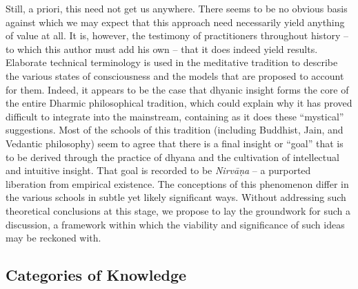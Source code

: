 \documentclass[pra,twocolumn,groupedaddress,10pt]{revtex4}
\theoremstyle{definition}
\begin{document}
Still, a priori, this need not get us anywhere. There seems to be no obvious basis against which we may expect that this approach need necessarily yield anything of value at all. It is, however, the testimony of practitioners throughout history -- to which this author must add his own -- that it does indeed yield results. Elaborate technical terminology is used in the meditative tradition to describe the various states of consciousness and the models that are proposed to account for them. Indeed, it appears to be the case that dhyanic insight forms the core of the entire Dharmic philosophical tradition, which could explain why it has proved difficult to integrate into the mainstream, containing as it does these ``mystical'' suggestions. Most of the schools of this tradition (including Buddhist, Jain, and Vedantic philosophy) seem to agree that there is a final insight or ``goal'' that is to be derived through the practice of dhyana and the cultivation of intellectual and intuitive insight. That goal is recorded to be \emph{Nirv\={a}\d{n}a} -- a purported liberation from empirical existence. The conceptions of this phenomenon differ in the various schools in subtle yet likely significant ways. Without addressing such theoretical conclusions at this stage, we propose to lay the groundwork for such a discussion, a framework within which the viability and significance of such ideas may be reckoned with.

\subsection{Categories of Knowledge}
\end{document}
